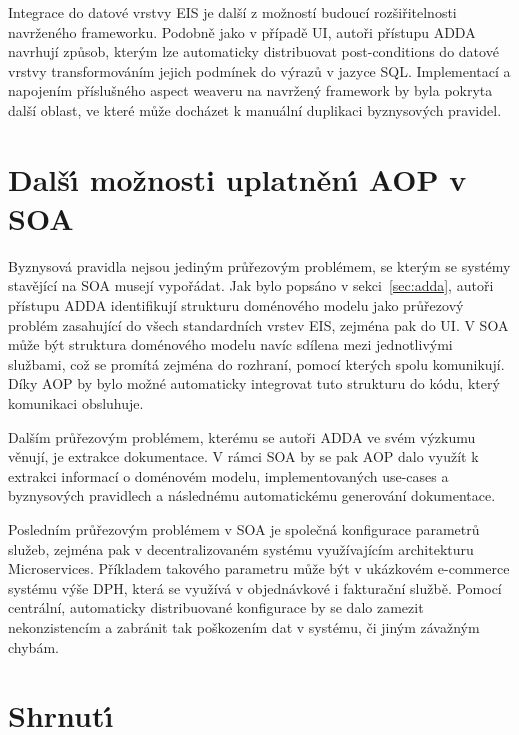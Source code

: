 Integrace do datové vrstvy \gls{EIS} je další z možností budoucí rozšiřitelnosti navrženého frameworku.
Podobně jako v případě \gls{UI}, autoři přístupu \gls{ADDA} navrhují způsob, kterým lze automaticky distribuovat
post-conditions do datové vrstvy transformováním jejich podmínek do výrazů v jazyce \gls{SQL}.
Implementací a napojením příslušného aspect weaveru na navržený framework by byla pokryta další oblast,
ve které může docházet k manuální duplikaci byznysových pravidel.

\section{Dalš\'{\i} možnosti uplatněn\'{\i} \gls{AOP} v \gls{SOA}}

Byznysová pravidla nejsou jediným průřezovým problémem, se kterým se systémy stavějící na \gls{SOA} musejí
vypořádat. Jak bylo popsáno v sekci~\ref{sec:adda}, autoři přístupu \gls{ADDA} identifikují strukturu
doménového modelu jako průřezový problém zasahující do všech standardních vrstev \gls{EIS},
zejména pak do \gls{UI}. V \gls{SOA} může být struktura doménového modelu navíc sdílena mezi jednotlivými
službami, což se promítá zejména do rozhraní, pomocí kterých spolu komunikují.
Díky \gls{AOP} by bylo možné automaticky integrovat tuto strukturu do kódu, který komunikaci obsluhuje.

Dalším průřezovým problémem, kterému se autoři \gls{ADDA} ve svém výzkumu věnují, je extrakce dokumentace.
V rámci \gls{SOA} by se pak \gls{AOP} dalo využít k extrakci informací o doménovém modelu, implementovaných use-cases
a byznysových pravidlech a následnému automatickému generování dokumentace.

Posledním průřezovým problémem v \gls{SOA} je společná konfigurace parametrů služeb, zejména pak v
decentralizovaném systému využívajícím architekturu Microservices. Příkladem takového parametru může
být v ukázkovém e-commerce systému výše DPH, která se využívá v objednávkové i
fakturační službě. Pomocí centrální, automaticky distribuované konfigurace by se dalo zamezit nekonzistencím
a zabránit tak poškozením dat v systému, či jiným závažným chybám.

\section{Shrnut\'{\i}}

